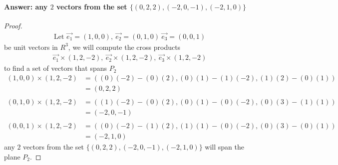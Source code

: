 \documentclass[12pt]{article}
\begin{document}
\begin{enumerate}
\begin{enumerate}
                            \paragraph{Answer: any $2$ vectors from the set $\{(0, 2, 2) , (-2, 0, -1), (-2, 1, 0)\}$}
                            \begin{proof}
                                    \begin{align*}
                                            \textrm{Let }\vec{e_1} = (1, 0, 0),\ \vec{e_2} = (0, 1, 0)\ \vec{e_3} = (0, 0, 1)
                                    \end{align*}
                                    be unit vectors in $R^3$, we will compute the cross products
                                    \begin{align*}
                                            \vec{e_1} \times (1, 2, -2),\ \vec{e_2} \times (1, 2, -2),\ \vec{e_3} \times (1, 2, -2)
                                    \end{align*}
                                    to find a set of vectors that spans $P_2$
                                    \begin{align*}
                                            (1,0,0) \times (1, 2, -2) & = ( (0)(-2) - (0)(2), (0)(1)-(1)(-2), (1)(2)-(0)(1) ) \\
                                                                      & = (0, 2, 2)                                           \\\\
                                            (0,1,0) \times (1, 2, -2) & = ( (1)(-2) - (0)(2), (0)(1)-(0)(-2), (0)(3)-(1)(1) ) \\
                                                                      & = (-2, 0, -1)                                         \\\\
                                            (0,0,1) \times (1, 2, -2) & = ( (0)(-2) - (1)(2), (1)(1)-(0)(-2), (0)(3)-(0)(1) ) \\
                                                                      & = (-2, 1, 0)
                                    \end{align*}
                                    any $2$ vectors from the set $\{(0, 2, 2) , (-2, 0, -1), (-2, 1, 0)\}$ will span the plane $P_2$.
                            \end{proof}
                            \pagebreak

\end{enumerate}
\end{enumerate}
\end{document}
